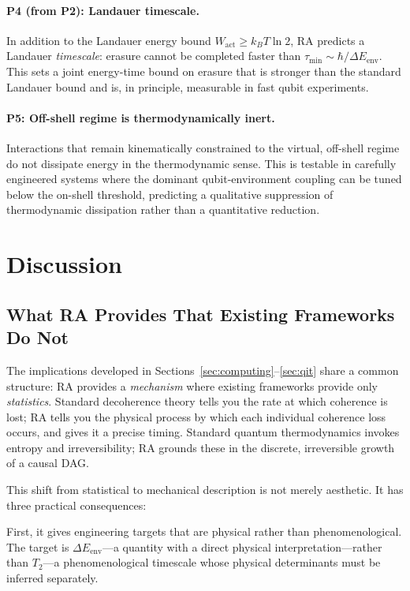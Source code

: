 \documentclass[11pt,a4paper]{article}
\theoremstyle{plain}
\theoremstyle{definition}
\theoremstyle{remark}
\begin{document}
\paragraph{P4 (from P2): Landauer timescale.}
In addition to the Landauer energy bound $W_{\mathrm{act}} \geq k_B T \ln 2$, RA
predicts a Landauer \emph{timescale}: erasure cannot be completed faster than
$\tau_{\mathrm{min}} \sim \hbar / \Delta E_{\mathrm{env}}$. This sets a joint
energy-time bound on erasure that is stronger than the standard Landauer bound and
is, in principle, measurable in fast qubit experiments.

\paragraph{P5: Off-shell regime is thermodynamically inert.}
Interactions that remain kinematically constrained to the virtual, off-shell regime
do not dissipate energy in the thermodynamic sense. This is testable in carefully
engineered systems where the dominant qubit-environment coupling can be tuned below
the on-shell threshold, predicting a qualitative suppression of thermodynamic
dissipation rather than a quantitative reduction.

\section{Discussion}
\label{sec:discussion}

\subsection{What RA Provides That Existing Frameworks Do Not}

The implications developed in Sections~\ref{sec:computing}--\ref{sec:qit} share a
common structure: RA provides a \emph{mechanism} where existing frameworks provide
only \emph{statistics}. Standard decoherence theory tells you the rate at which
coherence is lost; RA tells you the physical process by which each individual
coherence loss occurs, and gives it a precise timing. Standard quantum
thermodynamics invokes entropy and irreversibility; RA grounds these in the
discrete, irreversible growth of a causal DAG.

This shift from statistical to mechanical description is not merely aesthetic.
It has three practical consequences:

First, it gives engineering targets that are physical rather than phenomenological.
The target is $\Delta E_{\mathrm{env}}$---a quantity with a direct physical
interpretation---rather than $T_2$---a phenomenological timescale whose physical
determinants must be inferred separately.
\end{document}
